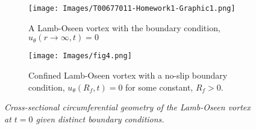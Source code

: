\documentclass{article}
\begin{document}
\begin{figure}[h]

\begin{subfigure}{0.5\textwidth}
\centering
\texttt{[image: Images/T00677011-Homework1-Graphic1.png]}
\caption{A Lamb-Oseen vortex with the boundary condition, $u_\theta (r\to \infty,t)=0$}
\label{1a}
\end{subfigure}
\begin{subfigure}{0.5\textwidth}
\texttt{[image: Images/fig4.png]}
\caption{Confined Lamb-Oseen vortex with a no-slip boundary condition, $u_\theta (R_f,t)=0$ for some constant, $R_f>0$.}
\label{1b}
\end{subfigure}
\caption{\textit{Cross-sectional circumferential geometry of the Lamb-Oseen vortex at $t=0$ given distinct boundary conditions.}}
\end{figure}
\newpage
\end{document}
